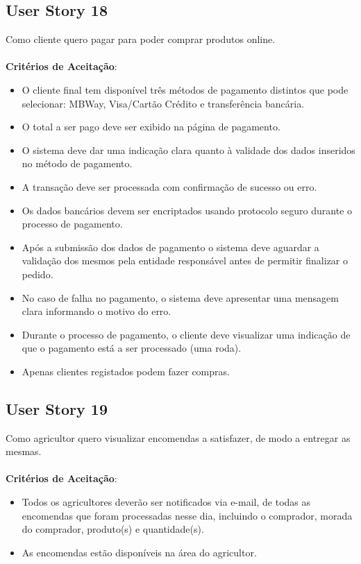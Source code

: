 \documentclass[a4paper,11pt]{article}
\begin{document}
\subsection{User Story 18}
Como cliente quero pagar para poder comprar produtos online.\\\\
\textbf{Critérios de Aceitação}:
\begin{itemize}
  \item O cliente final tem disponível três métodos de pagamento distintos que pode selecionar: MBWay, Visa/Cartão Crédito e transferência bancária.
  \item O total a ser pago deve ser exibido na página de pagamento.
  \item O sistema deve dar uma indicação clara quanto à validade dos dados inseridos no método de pagamento.
  \item A transação deve ser processada com confirmação de sucesso ou erro.
  \item Os dados bancários devem ser encriptados usando protocolo seguro durante o processo de pagamento.
  \item Após a submissão dos dados de pagamento o sistema deve aguardar a validação dos mesmos pela entidade responsável antes de permitir finalizar o pedido.
  \item No caso de falha no pagamento, o sistema deve apresentar uma mensagem clara informando o motivo do erro.
  \item Durante o processo de pagamento, o cliente deve visualizar uma indicação de que o pagamento está a ser processado (uma roda).
  \item Apenas clientes registados podem fazer compras.
\end{itemize}
\subsection{User Story 19}
Como agricultor quero visualizar encomendas a satisfazer, de modo a entregar as mesmas.\\\\
\textbf{Critérios de Aceitação}:
\begin{itemize}
  \item Todos os agricultores deverão ser notificados via e-mail, de todas as encomendas que foram processadas nesse dia, incluindo o comprador, morada do comprador, produto(s) e quantidade(s).
  \item As encomendas estão disponíveis na área do agricultor.
\end{itemize}
\end{document}
